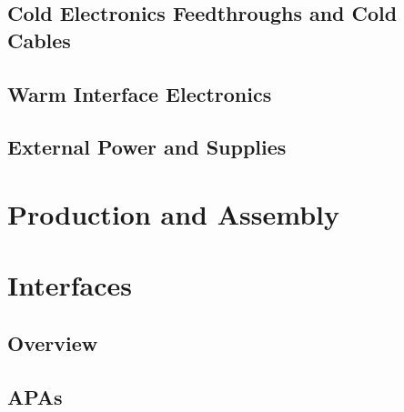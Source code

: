 \subsection{Cold Electronics Feedthroughs and Cold Cables}
\label{sec:fdsp-tpc-elec-design-ft}


\subsection{Warm Interface Electronics}
\label{sec:fdsp-tpc-elec-design-warm}


\subsection{External Power and Supplies}
\label{sec:fdsp-tpc-elec-design-external}



\section{Production and Assembly}
\label{sec:fdsp-tpc-elec-prod}



\section{Interfaces}
\label{sec:fdsp-tpc-elec-intfc}


\subsection{Overview}
\label{sec:fdsp-tpc-elec-intfc-ov}


\subsection{APAs}
\label{sec:fdsp-tpc-elec-intfc-apa}


